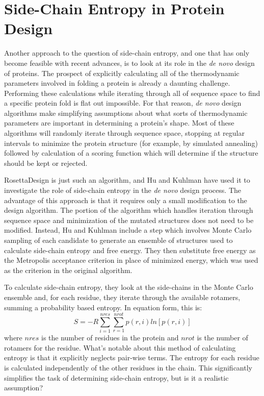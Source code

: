 \section*{Side-Chain Entropy in Protein Design}
\label{sec:side_chain_entropy_in_protein_design}
Another approach to the question of side-chain entropy, and one that has only become feasible with recent advances, is to look at its role in the \emph{de novo} design of proteins. The prospect of explicitly calculating all of the thermodynamic parameters involved in folding a protein is already a daunting challenge. Performing these calculations while iterating through all of sequence space to find a specific protein fold is flat out impossible. For that reason, \emph{de novo} design algorithms make simplifying assumptions about what sorts of thermodynamic parameters are important in determining a protein's shape\cite{Lippow:2007p360}. Most of these algorithms will randomly iterate through sequence space, stopping at regular intervals to minimize the protein structure (for example, by simulated annealing) followed by calculation of a scoring function which will determine if the structure should be kept or rejected.

RosettaDesign is just such an algorithm, and Hu and Kuhlman have used it to investigate the role of side-chain entropy in the \emph{de novo} design process\cite{Hu:2006p68}. The advantage of this approach is that it requires only a small modification to the design algorithm. The portion of the algorithm which handles iteration through sequence space and minimization of the mutated structures does not need to be modified. Instead, Hu and Kuhlman include a step which involves Monte Carlo sampling of each candidate to generate an ensemble of structures used to calculate side-chain entropy and free energy. They then substitute free energy as the Metropolis acceptance criterion in place of minimized energy, which was used as the criterion in the original algorithm.

To calculate side-chain entropy, they look at the side-chains in the Monte Carlo ensemble and, for each residue, they iterate through the available rotamers, summing a probability based entropy. In equation form, this is: \[
	S = -R \sum^{nres}_{i=1}\sum^{nrot}_{r=1}p(r,i)ln[p(r,i)]
\] where $nres$ is the number of residues in the protein and $nrot$ is the number of rotamers for the residue. What's notable about this method of calculating entropy is that it explicitly neglects pair-wise terms. The entropy for each residue is calculated independently of the other residues in the chain. This significantly simplifies the task of determining side-chain entropy, but is it a realistic assumption?


